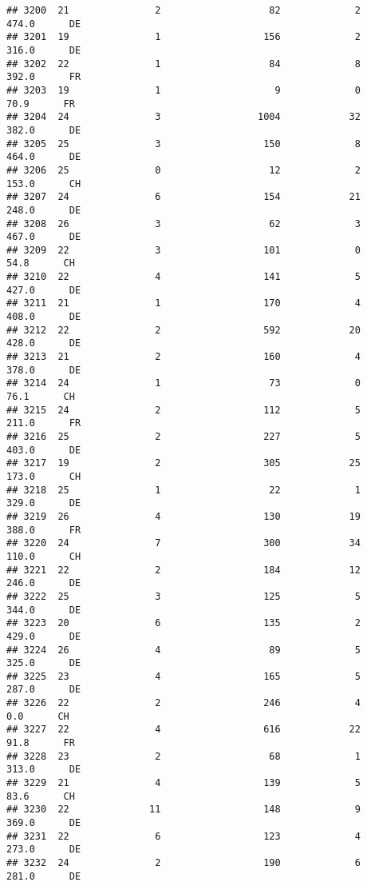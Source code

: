 \documentclass[
]{article}
\begin{document}
\begin{verbatim}
## 3200  21               2                   82             2    474.0      DE
## 3201  19               1                  156             2    316.0      DE
## 3202  22               1                   84             8    392.0      FR
## 3203  19               1                    9             0     70.9      FR
## 3204  24               3                 1004            32    382.0      DE
## 3205  25               3                  150             8    464.0      DE
## 3206  25               0                   12             2    153.0      CH
## 3207  24               6                  154            21    248.0      DE
## 3208  26               3                   62             3    467.0      DE
## 3209  22               3                  101             0     54.8      CH
## 3210  22               4                  141             5    427.0      DE
## 3211  21               1                  170             4    408.0      DE
## 3212  22               2                  592            20    428.0      DE
## 3213  21               2                  160             4    378.0      DE
## 3214  24               1                   73             0     76.1      CH
## 3215  24               2                  112             5    211.0      FR
## 3216  25               2                  227             5    403.0      DE
## 3217  19               2                  305            25    173.0      CH
## 3218  25               1                   22             1    329.0      DE
## 3219  26               4                  130            19    388.0      FR
## 3220  24               7                  300            34    110.0      CH
## 3221  22               2                  184            12    246.0      DE
## 3222  25               3                  125             5    344.0      DE
## 3223  20               6                  135             2    429.0      DE
## 3224  26               4                   89             5    325.0      DE
## 3225  23               4                  165             5    287.0      DE
## 3226  22               2                  246             4      0.0      CH
## 3227  22               4                  616            22     91.8      FR
## 3228  23               2                   68             1    313.0      DE
## 3229  21               4                  139             5     83.6      CH
## 3230  22              11                  148             9    369.0      DE
## 3231  22               6                  123             4    273.0      DE
## 3232  24               2                  190             6    281.0      DE

\end{verbatim}
\end{document}

